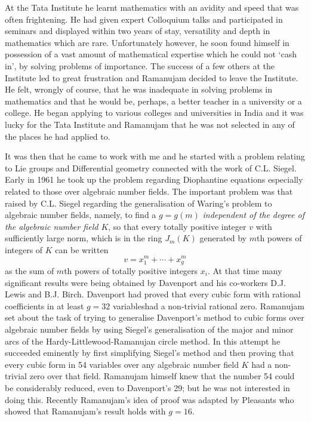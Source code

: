 At the Tata Institute he learnt mathematics with an avidity and speed 
that was often frightening. He had given expert Colloquium talks and 
participated in seminars and displayed within two years of stay, 
versatility and depth in mathematics which are rare. Unfortunately 
however, he soon found himself in possession of a vast amount of 
mathematical expertise which he could not `cash in', by solving 
problems of importance. The success of a few others at the Institute 
led to great frustration and Ramanujam decided to leave the Institute. 
He felt, wrongly of course, that he was inadequate in solving problems 
in mathematics and that he would be, perhaps, a better teacher in a 
university or a college. He began applying to various colleges and 
universities in India and it was lucky for the Tata Institute and 
Ramanujam that he was not selected in any of the places he had applied 
to. 

It was then that he came to work with me and he started with a problem 
relating to Lie groups and Differential geometry connected with the 
work of C.L. Siegel. Early in 1961 he took up the problem regarding 
Diophantine equations especially related to those over algebraic 
number fields. The important problem was that raised by C.L. Siegel 
regarding the generalisation of Waring's problem to algebraic number 
fields, namely, to find a $g=g(m)$ \emph{independent of the degree of 
the algebraic number field $K$}, so that every totally positive 
integer $v$ with sufficiently large norm, which is in the ring 
$J_m (K)$ generated by $m$th powers of integers of $K$ can be written
$$
v=x_1^m+\cdots +x_g^m
$$
as the sum of $m$th powers of totally positive integers $x_i$. At that 
time many significant results were being obtained by Davenport and his 
co-workers D.J. Lewis and B.J. Birch. Davenport had proved that every 
cubic form with rational coefficients in at least $g=32$ 
variables\pageoriginale had a non-trivial rational zero. Ramanujam set 
about the task of trying to generalise Davenport's method to cubic 
forms over algebraic number fields by using Siegel's generalisation of 
the major and minor arcs of the Hardy-Littlewood-Ramanujan circle 
method. In this attempt he succeeded eminently by first simplifying 
Siegel's method and then proving that every cubic form in 54 variables 
over any algebraic number field $K$ had a non-trivial zero over that 
field. Ramanujam himself knew that the number 54 could be considerably 
reduced, even to Davenport's 29; but he was not interested in doing 
this. Recently Ramanujam's idea of proof was adapted by Pleasants who 
showed that Ramanujam's result holds with $g=16$. 

